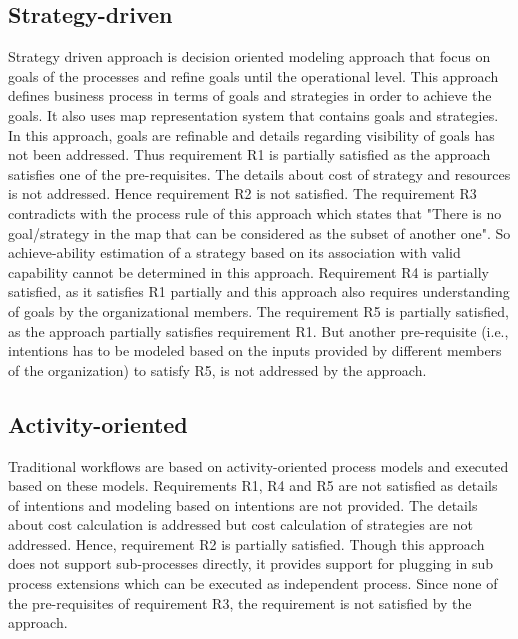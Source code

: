 \subsection{Strategy-driven} 
Strategy driven approach is decision oriented modeling approach that focus on goals of the processes and refine goals until the operational level. This approach defines business process in terms of goals and strategies in order to achieve the goals. It also uses map representation system that contains goals and strategies. In this approach, goals are refinable and details regarding visibility of goals has not been addressed. Thus requirement R1 is partially satisfied as the approach satisfies one of the pre-requisites. The details about cost of strategy and resources is not addressed. Hence requirement R2 is not satisfied. The requirement R3 contradicts with the process rule of this approach which states that "There is no goal/strategy in the map that can be considered as the subset of another one". So achieve-ability estimation of a strategy based on its association with valid capability cannot be determined in this approach. Requirement R4 is partially satisfied, as it satisfies R1 partially and this approach also requires understanding of goals by the organizational members. The requirement R5 is partially satisfied, as the approach partially satisfies requirement R1. But another pre-requisite (i.e., intentions has to be modeled based on the inputs provided by different members of the organization) to satisfy R5, is not addressed by the approach. 

\subsection{Activity-oriented} 
Traditional workflows are based on activity-oriented process models and executed based on these models. Requirements R1, R4 and R5 are not satisfied as details of intentions and modeling based on intentions are not provided. The details about cost calculation is addressed but cost calculation of strategies are not addressed. Hence, requirement R2 is partially satisfied. Though this approach does not support sub-processes directly, it provides support for plugging in sub process extensions which can be executed as independent process. Since none of the pre-requisites of requirement R3, the requirement is not satisfied by the approach. 

